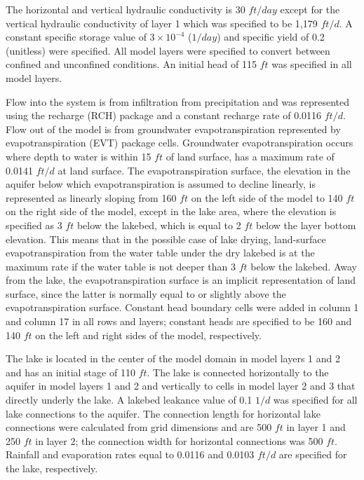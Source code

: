 

The horizontal and vertical hydraulic conductivity is 30 $ft/day$ except for the vertical hydraulic conductivity of layer 1 which was specified to be 1,179 $ft/d$. A constant specific storage value of $3 \times 10^{-4}$ ($1/day$) and specific yield of 0.2 (unitless) were specified. All model layers were specified to convert between confined and unconfined conditions. An initial head of 115 $ft$ was specified in all model layers. 

Flow into the system is from infiltration from precipitation and was represented using the recharge (RCH) package and a constant recharge rate of 0.0116 $ft/d$. Flow out of the model is from groundwater evapotranspiration represented by evapotranspiration (EVT) package cells. Groundwater evapotranspiration occurs where depth to water is within 15 $ft$ of land surface, has a maximum rate of 0.0141 $ft/d$ at land surface. The evapotranspiration surface, the elevation in the aquifer below which evapotranspiration is assumed to decline linearly, is represented as linearly sloping from 160 $ft$ on the left side of the model to 140 $ft$ on the right side of the model, except in the lake area, where the elevation is specified as 3 $ft$ below the lakebed, which is equal to 2 $ft$ below the layer bottom elevation. This means that in the possible case of lake drying, land-surface evapotranspiration from the water table under the dry lakebed is at the maximum rate if the water table is not deeper than 3 $ft$ below the lakebed. Away from the lake, the evapotranspiration surface is an implicit representation of land surface, since the latter is normally equal to or slightly above the evapotranspiration surface. Constant head boundary cells were added in column 1 and column 17 in all rows and layers; constant heads are specified to be 160 and 140 $ft$ on the left and right sides of the model, respectively.

The lake is located in the center of the model domain in model layers 1 and 2 and has an initial stage of 110 $ft$. The lake is connected horizontally to the aquifer in model layers 1 and 2 and vertically to cells in model layer 2 and 3 that directly underly the lake. A lakebed leakance value of 0.1 $1/d$ was specified for all lake connections to the aquifer. The connection length for horizontal lake connections were calculated from grid dimensions and are 500 $ft$ in layer 1 and 250 $ft$ in layer 2; the connection width for horizontal connections was 500 $ft$. Rainfall and evaporation rates equal to 0.0116 and 0.0103 $ft/d$ are specified for the lake, respectively.

